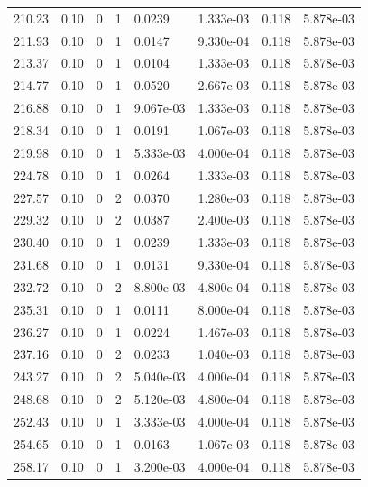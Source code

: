 \documentclass[preview]{standalone}
\begin{document}
{{{{\begin{tabular}{L{1.2cm}C{1.2cm} C{0.3cm}C{0.5cm} C{1.4cm}C{1.4cm} C{1.4cm}C{1.4cm}}
  210.23  &  0.10  & 0     &  1 &  0.0239  & 1.333e-03  & 0.118 &  5.878e-03   \\ 
  211.93  &  0.10  & 0     &  1 &  0.0147  & 9.330e-04  & 0.118 &  5.878e-03   \\ 
  213.37  &  0.10  & 0     &  1 &  0.0104  & 1.333e-03  & 0.118 &  5.878e-03   \\ 
  214.77  &  0.10  & 0     &  1 &  0.0520  & 2.667e-03  & 0.118 &  5.878e-03   \\ 
  216.88  &  0.10  & 0     &  1 &  9.067e-03  & 1.333e-03  & 0.118 &  5.878e-03   \\ 
  218.34  &  0.10  & 0     &  1 &  0.0191  & 1.067e-03  & 0.118 &  5.878e-03   \\ 
  219.98  &  0.10  & 0     &  1 &  5.333e-03  & 4.000e-04  & 0.118 &  5.878e-03   \\ 
  224.78  &  0.10  & 0     &  1 &  0.0264  & 1.333e-03  & 0.118 &  5.878e-03   \\ 
  227.57  &  0.10  & 0     &  2 &  0.0370  & 1.280e-03  & 0.118 &  5.878e-03   \\ 
  229.32  &  0.10  & 0     &  2 &  0.0387  & 2.400e-03  & 0.118 &  5.878e-03   \\ 
  230.40  &  0.10  & 0     &  1 &  0.0239  & 1.333e-03  & 0.118 &  5.878e-03   \\ 
  231.68  &  0.10  & 0     &  1 &  0.0131  & 9.330e-04  & 0.118 &  5.878e-03   \\ 
  232.72  &  0.10  & 0     &  2 &  8.800e-03  & 4.800e-04  & 0.118 &  5.878e-03   \\ 
  235.31  &  0.10  & 0     &  1 &  0.0111  & 8.000e-04  & 0.118 &  5.878e-03   \\ 
  236.27  &  0.10  & 0     &  1 &  0.0224  & 1.467e-03  & 0.118 &  5.878e-03   \\ 
  237.16  &  0.10  & 0     &  2 &  0.0233  & 1.040e-03  & 0.118 &  5.878e-03   \\ 
  243.27  &  0.10  & 0     &  2 &  5.040e-03  & 4.000e-04  & 0.118 &  5.878e-03   \\ 
  248.68  &  0.10  & 0     &  2 &  5.120e-03  & 4.800e-04  & 0.118 &  5.878e-03   \\ 
  252.43  &  0.10  & 0     &  1 &  3.333e-03  & 4.000e-04  & 0.118 &  5.878e-03   \\ 
  254.65  &  0.10  & 0     &  1 &  0.0163  & 1.067e-03  & 0.118 &  5.878e-03   \\ 
  258.17  &  0.10  & 0     &  1 &  3.200e-03  & 4.000e-04  & 0.118 &  5.878e-03   \\ 

\end{tabular}}}}}
\end{document}
